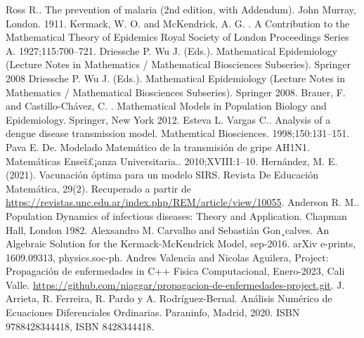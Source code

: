 \documentclass[journal]{IEEEtran}
\begin{document}
\begin{thebibliography}{1}

  Ross R.. The prevention of malaria (2nd edition, with Addendum). John
  Murray, London. 1911.
  Kermack, W. O. and McKendrick, A. G. . A Contribution to the
  Mathematical Theory of Epidemics
  Royal Society of London Proceedings Series A. 1927;115:700–721.
  Driessche P. Wu J. (Eds.). Mathematical Epidemiology (Lecture Notes in
  Mathematics / Mathematical
  Biosciences Subseries). Springer 2008
  Driessche P. Wu J. (Eds.). Mathematical Epidemiology (Lecture Notes in
  Mathematics / Mathematical
  Biosciences Subseries). Springer 2008.
  Brauer, F. and Castillo-Chávez, C. . Mathematical Models in Population
  Biology and Epidemiology.
  Springer, New York 2012.
  Esteva L. Vargas C.. Analysis of a dengue disease transmission model.
  Mathemtical Biosciences.
  1998;150:131–151.
  Pava E. De. Modelado Matemático de la transmisión de gripe AH1N1.
  Matemáticas Enseï£¡anza
  Universitaria.. 2010;XVIII:1–10.
  Hernández, M. E. (2021). Vacunación óptima para un modelo SIRS. Revista
  De Educación Matemática, 29(2).
  Recuperado a partir de
  \url{https://revistas.unc.edu.ar/index.php/REM/article/view/10055}.
  Anderson R. M.. Population Dynamics of infectious diseases: Theory and
  Application. Chapman
  Hall, London 1982.
  Alexsandro M. Carvalho and Sebastián Gon¸calves. An Algebraic Solution
  for the Kermack-McKendrick Model, sep-2016.
  arXiv e-prints, 1609.09313, physics.soc-ph.
  Andres Valencia and Nicolas Aguilera, Project: Propagación de
  enfermedades in C++
  Fisica Computacional, Enero-2023, Cali Valle.
  \url{https://github.com/niaggar/propagacion-de-enfermedades-project.git}.
  J. Arrieta, R. Ferreira, R. Pardo y A. Rodríguez-Bernal. Análisis Numérico
  de Ecuaciones Diferenciales Ordinarias.
  Paraninfo, Madrid, 2020. ISBN 9788428344418, ISBN 8428344418.

\end{thebibliography}
\end{document}
